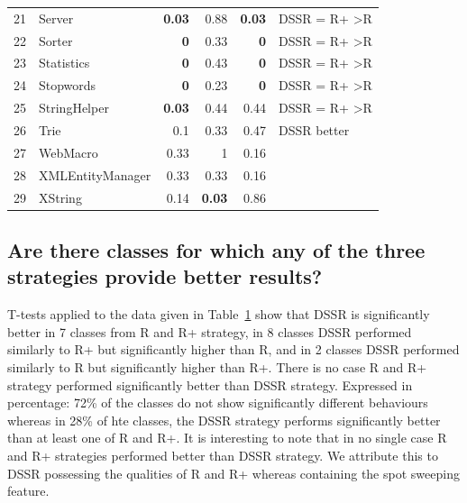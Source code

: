 \begin{table}[htp]
\begin{tabular}{rlrrrl}
21		&	Server			&	\textbf{0.03}		& 0.88		&\textbf{0.03} 	& DSSR = R+ \textgreater R \\
22		&	Sorter			& 	\textbf{0}			& 0.33		&\textbf{0}		& DSSR = R+ \textgreater R \\
23		&	Statistics			&	\textbf{0}			& 0.43		&\textbf{0}		& DSSR = R+ \textgreater R\\
24		&	Stopwords		&	\textbf{0}			& 0.23		&\textbf{0}		& DSSR = R+ \textgreater R \\
25		&	StringHelper		&	\textbf{0.03}		& 0.44		&0.44		& DSSR = R+ \textgreater R\\
26		& 	Trie				&	0.1				& 0.33		&0.47		& DSSR better \\
27		&	WebMacro		&	0.33				& 1			&0.16		& \\
28		&	XMLEntityManager	&	0.33				& 0.33		&0.16		& \\
29 		&	XString			&	0.14				&\textbf{0.03}	&0.86		& \\


\end{tabular}
\bigskip
\label{table:ttest}
\end{table}

\subsection{Are there classes for which any of the three strategies provide better results?}


T-tests applied to the data given in Table~\ref{table:ttest} show that DSSR is significantly better in 7 classes from R and R+ strategy, in 8 classes DSSR performed similarly to R+  but significantly higher than R, and in 2 classes DSSR performed similarly to R but significantly higher than R+. There is no case R and R+ strategy performed significantly better than DSSR strategy. Expressed in percentage: 72\%  of the classes do not show significantly different behaviours whereas in 28\% of hte classes, the DSSR strategy performs significantly better than at least one of R and R+. It is interesting to note that in no single case R and R+ strategies performed better than DSSR strategy. We attribute this to DSSR possessing the qualities of R and R+ whereas containing the spot sweeping feature.


